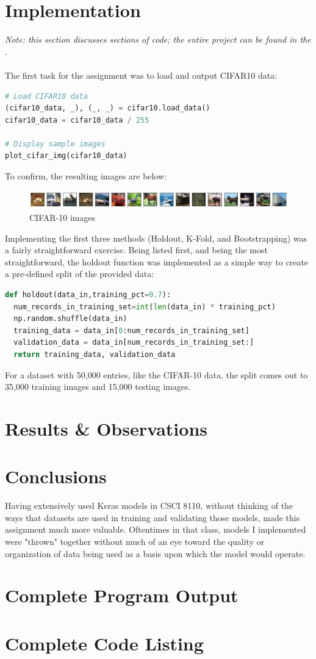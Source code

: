 \documentclass{article}
\begin{document}
\section{Implementation} \label{impl}
\textit{Note: this section discusses sections of code; the entire project can be found in the }.
\\\\
The first task for the assignment was to load and output CIFAR10 data:
\begin{lstlisting}[language=Python]
# Load CIFAR10 data
(cifar10_data, _), (_, _) = cifar10.load_data()
cifar10_data = cifar10_data / 255

# Display sample images
plot_cifar_img(cifar10_data)
\end{lstlisting}
To confirm, the resulting images are below:

\begin{figure}[H]
    \centering
    \includegraphics[width=6in]{csci-8920/hw-1/images/8920-hw-1-cropped.png}
    \caption{CIFAR-10 images}
    \label{fig:data}
\end{figure}

Implementing the first three methods (Holdout, K-Fold, and Bootstrapping) was a fairly straightforward exercise.
Being listed first, and being the most straightforward, the holdout function was implemented as a simple way to create a pre-defined split of the provided data:
\begin{lstlisting}[language=Python]
def holdout(data_in,training_pct=0.7):
  num_records_in_training_set=int(len(data_in) * training_pct)
  np.random.shuffle(data_in)
  training_data = data_in[0:num_records_in_training_set]
  validation_data = data_in[num_records_in_training_set:]
  return training_data, validation_data
\end{lstlisting}

For a dataset with 50,000 entries, like the CIFAR-10 data, the split comes out to 35,000 training images and 15,000 testing images.


\section{Results \& Observations} \label{observations}
\section{Conclusions}
Having extensively used Keras models in CSCI 8110, without thinking of the ways that datasets are used in training and validating those models, made this assignment much more valuable.
Oftentimes in that class, models I implemented were "thrown" together without much of an eye toward the quality or organization of data being used as a basis upon which the model would operate.

\newpage
\begin{appendices}
\section{Complete Program Output}

\section{Complete Code Listing} \label{codelist}

\end{appendices}
\end{document}
